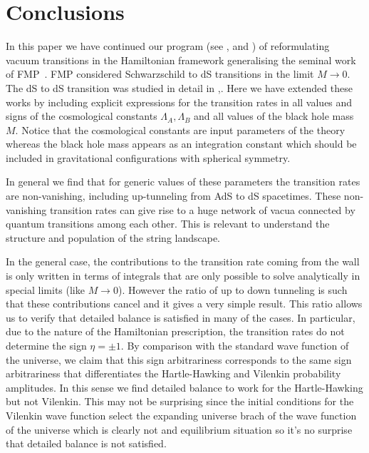 \documentclass[a4paper,11pt]{article}
\numberwithin{equation}{section}
\numberwithin{equation}{section}
\begin{document}
\section{Conclusions}





In this paper we have continued our program (see \cite{DeAlwis:2019rxg},  \cite{Cespedes:2020xpn} and \cite{Pasquarella:2022ibb}) of reformulating vacuum transitions in the Hamiltonian framework generalising the seminal work of FMP~\cite{Fischler:1990pk}. FMP considered Schwarzschild to dS transitions in the limit $M\rightarrow 0$. The dS to dS transition was studied in detail in \cite{Bachlechner:2016mtp},\cite{DeAlwis:2019rxg}. Here we have extended these works by including explicit expressions for the transition rates in all values and signs of the cosmological constants $\Lambda_A, \Lambda_B$  and all values of the black hole mass $M$. Notice that the cosmological constants are input parameters of the theory whereas the black hole mass appears as an integration constant which should be included in gravitational configurations with  spherical symmetry. 
\vskip 1mm

In general we find that for generic values of these parameters the transition rates are non-vanishing, including up-tunneling  from AdS to dS spacetimes. These non-vanishing transition rates can give rise to a huge network of vacua connected by quantum transitions among each other. This is  relevant to understand the structure and population of the string landscape.
\vskip 1mm

In the general case, the contributions to the transition rate coming from the wall is only written in terms of integrals that are only possible to solve analytically in special limits (like $M\rightarrow 0$). However the ratio of up to down tunneling is such that these contributions cancel and it gives a very simple result. This ratio allows us to verify that detailed balance is satisfied in many of the cases. In particular, due to the nature of the Hamiltonian prescription, the transition rates do not determine the sign $\eta=\pm 1$. By comparison with the standard wave function of the universe, we claim that this sign arbitrariness corresponds to the same sign arbitrariness that differentiates the Hartle-Hawking and Vilenkin probability amplitudes. In this sense we find detailed balance to work for the Hartle-Hawking but not Vilenkin. This may not be surprising since the initial conditions for the Vilenkin wave function select the expanding universe brach of the wave function of the universe which is clearly not and equilibrium situation so it's no surprise that detailed balance is not satisfied.
\vskip 1mm
\end{document}
